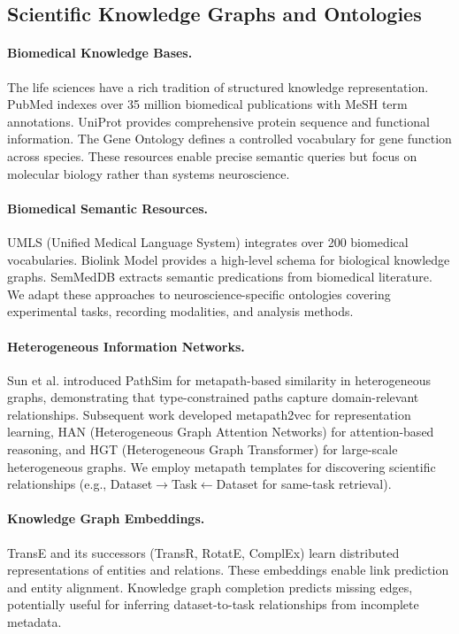 \documentclass{article}
\theoremstyle{definition}
\begin{document}
\subsection{Scientific Knowledge Graphs and Ontologies}

\paragraph{Biomedical Knowledge Bases.} The life sciences have a rich tradition of structured knowledge representation. PubMed \citep{sayers2019pubmed} indexes over 35 million biomedical publications with MeSH term annotations. UniProt \citep{uniprot2021uniprot} provides comprehensive protein sequence and functional information. The Gene Ontology \citep{gene2021gene} defines a controlled vocabulary for gene function across species. These resources enable precise semantic queries but focus on molecular biology rather than systems neuroscience.

\paragraph{Biomedical Semantic Resources.} UMLS (Unified Medical Language System) \citep{bodenreider2004unified} integrates over 200 biomedical vocabularies. Biolink Model \citep{biolink2020model} provides a high-level schema for biological knowledge graphs. SemMedDB \citep{kilicoglu2012semmeddb} extracts semantic predications from biomedical literature. We adapt these approaches to neuroscience-specific ontologies covering experimental tasks, recording modalities, and analysis methods.

\paragraph{Heterogeneous Information Networks.} Sun et al. \citep{sun2011pathsim} introduced PathSim for metapath-based similarity in heterogeneous graphs, demonstrating that type-constrained paths capture domain-relevant relationships. Subsequent work developed metapath2vec \citep{dong2017metapath2vec} for representation learning, HAN (Heterogeneous Graph Attention Networks) \citep{wang2019heterogeneous} for attention-based reasoning, and HGT (Heterogeneous Graph Transformer) \citep{hu2020heterogeneous} for large-scale heterogeneous graphs. We employ metapath templates for discovering scientific relationships (e.g., Dataset$\rightarrow$Task$\leftarrow$Dataset for same-task retrieval).

\paragraph{Knowledge Graph Embeddings.} TransE \citep{bordes2013translating} and its successors (TransR, RotatE, ComplEx) learn distributed representations of entities and relations. These embeddings enable link prediction and entity alignment. Knowledge graph completion \citep{wang2017knowledge} predicts missing edges, potentially useful for inferring dataset-to-task relationships from incomplete metadata.
\end{document}
